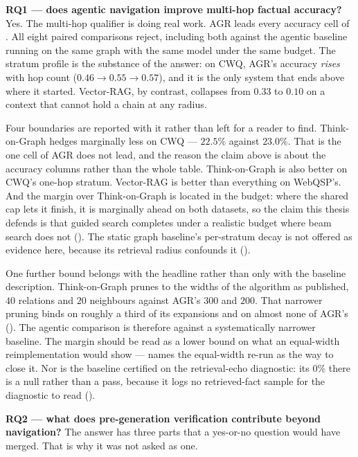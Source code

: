 \textbf{RQ1 --- does agentic navigation improve multi-hop factual accuracy?}
Yes. The multi-hop qualifier is doing real work. AGR leads every accuracy
cell of . All eight paired comparisons reject, including both
against the agentic baseline running on the same graph with the same model under
the same budget. The stratum profile is the substance of the answer: on CWQ,
AGR's accuracy \emph{rises} with hop count ($0.46 \to 0.55 \to 0.57$), and it is
the only system that ends above where it started. Vector-RAG, by contrast,
collapses from $0.33$ to $0.10$ on a context that cannot hold a chain at any
radius.

Four boundaries are reported with it rather than left for a reader to find.
Think-on-Graph hedges marginally less on CWQ --- $22.5\%$ against $23.0\%$.
That is the one cell of  AGR does not lead, and the reason the
claim above is about the accuracy columns rather than the whole table.
Think-on-Graph is also better on CWQ's one-hop stratum. Vector-RAG is better
than everything on WebQSP's. And the margin over Think-on-Graph is located in
the budget: where the shared cap lets it finish, it is marginally ahead on both
datasets, so the claim this thesis defends is that guided search completes under
a realistic budget where beam search does not (). The static
graph baseline's per-stratum decay is not offered as evidence here, because its
retrieval radius confounds it ().

One further bound belongs with the headline rather than only with the baseline
description. Think-on-Graph prunes to the widths of the algorithm as published,
$40$ relations and $20$ neighbours against AGR's $300$ and $200$. That narrower
pruning binds on roughly a third of its expansions and on almost none of AGR's
(). The agentic comparison is therefore against a
systematically narrower baseline. The margin should be read as a lower bound
on what an equal-width reimplementation would show ---
 names the equal-width re-run as the way to close it.
Nor is the baseline certified on the retrieval-echo diagnostic: its $0\%$ there
is a null rather than a pass, because it logs no retrieved-fact sample for the
diagnostic to read ().

\textbf{RQ2 --- what does pre-generation verification contribute beyond
navigation?} The answer has three parts that a yes-or-no question would have
merged. That is why it was not asked as one.

